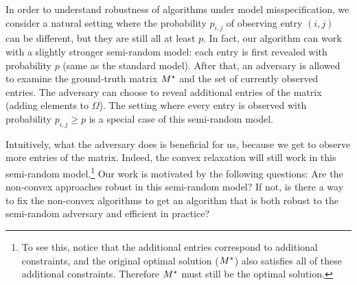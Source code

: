 In order to understand robustness of algorithms under model misspecification, we consider a natural setting where the probability $p_{i,j}$ of observing entry $(i,j)$ can be different, but they are still all at least $p$. In fact, our algorithm can work with a slightly stronger semi-random model: each entry is first revealed with probability $p$ (same as the standard model). After that, an adversary is allowed to examine the ground-truth matrix $M^\star$ and the set of currently observed entries. The adversary can choose to reveal additional entries of the matrix (adding elements to $\Omega$). 
The setting where every entry is observed with probability $p_{i,j} \ge p$ is a special case of this semi-random model.

Intuitively, what the adversary does is beneficial for us, because we get to observe more entries of the matrix. Indeed, the convex relaxation will still work in this semi-random model.\footnote{To see this, notice that the additional entries correspond to additional constraints, and the original optimal solution ($M^\star$) also satisfies all of these additional constraints. Therefore $M^\star$ must still be the optimal solution.} Our work is motivated by the following questions: Are the non-convex approaches robust in this semi-random model? If not, is there a way to fix the non-convex algorithms to get an algorithm that is both robust to the semi-random adversary and efficient in practice?

